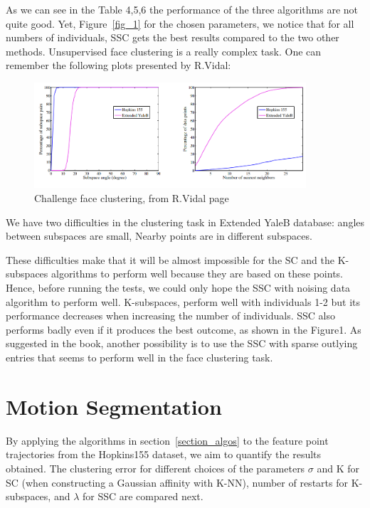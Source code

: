 \documentclass[12pt,a4paper,onecolumn]{article}
\begin{document}
As we can see in the Table 4,5,6 the performance of the three algorithms are not quite good. Yet, Figure~\ref{fig_1} for the chosen parameters, we notice that for all numbers of individuals, SSC gets the best results compared to the two other methods. Unsupervised face clustering is a really complex task. One can remember the following plots presented by R.Vidal:

\begin{figure}[H]
	\centering
	\includegraphics[width = 0.9\textwidth]{Challenge-face-clustering.PNG}
	\caption{Challenge face clustering, from R.Vidal \cite{vidal2016PCA} page}
	\label{fig_challenge_face_clustering}
\end{figure}


We have two difficulties in the clustering task in Extended YaleB database: angles between subspaces are small, Nearby points are in different subspaces.


These difficulties make that it will be almost impossible for the SC and the K-subspaces algorithms to perform well because they are based on these points. Hence, before running the tests, we could only hope the SSC with noising data algorithm to perform well. K-subspaces, perform well with individuals 1-2 but its performance decreases when increasing the number of individuals. SSC also performs badly even if it produces the best outcome, as shown in the Figure1. As suggested in the book, another possibility is to use the SSC with sparse outlying entries that seems to perform well in the face clustering task.


\section{Motion Segmentation}

By applying the algorithms in section~\ref{section_algos} to the feature point trajectories from the Hopkins155 dataset, we aim to quantify the results obtained. The clustering error for different choices of the parameters \(\sigma\) and K for SC (when constructing a Gaussian affinity with K-NN), number of restarts for K-subspaces, and \(\lambda\) for SSC are compared next.
\end{document}
